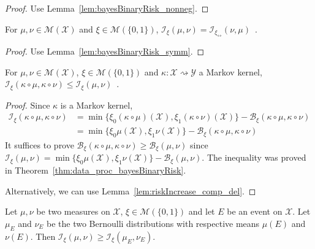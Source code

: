 \begin{proof}\leanok
{}
Use Lemma~\ref{lem:bayesBinaryRisk_nonneg}.
\end{proof}


\begin{lemma}
  \label{lem:statInfo_symm}
  \leanok
  For $\mu, \nu \in \mathcal M(\mathcal X)$ and $\xi \in \mathcal M(\{0,1\})$, $\mathcal I_\xi(\mu, \nu) = \mathcal I_{\xi_\leftrightarrow}(\nu, \mu)$~.
\end{lemma}

\begin{proof}\leanok
{}
Use Lemma~\ref{lem:bayesBinaryRisk_symm}.
\end{proof}


\begin{theorem}
  \label{thm:data_proc_statInfo}
  \leanok
  For $\mu, \nu \in \mathcal M(\mathcal X)$, $\xi \in \mathcal M(\{0,1\})$ and $\kappa : \mathcal X \rightsquigarrow \mathcal Y$ a Markov kernel, $\mathcal I_\xi(\kappa \circ \mu, \kappa \circ \nu) \le \mathcal I_\xi(\mu, \nu)$~.
\end{theorem}

\begin{proof}\leanok
{}
Since $\kappa$ is a Markov kernel,
\begin{align*}
\mathcal I_\xi(\kappa \circ \mu, \kappa \circ \nu)
&= \min\{\xi_0(\kappa \circ \mu)(\mathcal X), \xi_1(\kappa \circ \nu)(\mathcal X)\} - \mathcal B_\xi(\kappa \circ \mu, \kappa \circ \nu)
\\
&= \min\{\xi_0 \mu(\mathcal X), \xi_1 \nu(\mathcal X)\} - \mathcal B_\xi(\kappa \circ \mu, \kappa \circ \nu)
\end{align*}
It suffices to prove $\mathcal B_\xi(\kappa \circ \mu, \kappa \circ \nu) \ge \mathcal B_\xi(\mu, \nu)$ since $\mathcal I_\xi(\mu, \nu) = \min\{\xi_0\mu(\mathcal X), \xi_1\nu(\mathcal X)\} - \mathcal B_\xi(\mu, \nu)$.
The inequality was proved in Theorem~\ref{thm:data_proc_bayesBinaryRisk}.

Alternatively, we can use Lemma~\ref{lem:riskIncrease_comp_del}.
\end{proof}


\begin{corollary}
  \label{cor:statInfo_data_proc_event}
  \leanok
  Let $\mu, \nu$ be two measures on $\mathcal X$, $\xi \in \mathcal M(\{0,1\})$ and let $E$ be an event on $\mathcal X$. Let $\mu_E$ and $\nu_E$ be the two Bernoulli distributions with respective means $\mu(E)$ and $\nu(E)$.
  Then $\mathcal I_\xi(\mu, \nu) \ge \mathcal I_\xi(\mu_E, \nu_E)$.
\end{corollary}

